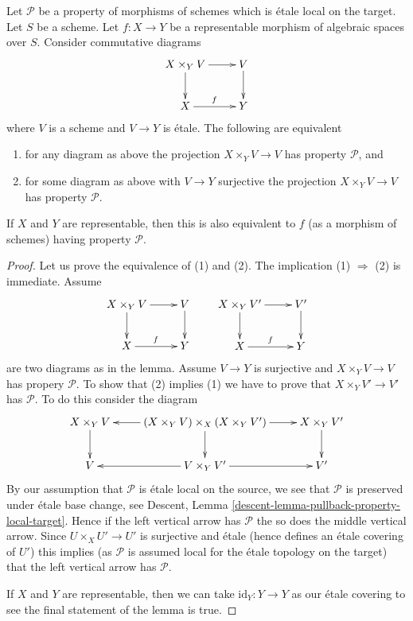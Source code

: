\begin{lemma}
\label{lemma-representable-etale-local-target}
Let $\mathcal{P}$ be a property of morphisms of schemes which is \'etale
local on the target. Let $S$ be a scheme.
Let $f : X \to Y$ be a representable morphism of algebraic spaces over $S$.
Consider commutative diagrams
$$
\xymatrix{
X \times_Y V \ar[d] \ar[r] & V \ar[d] \\
X \ar[r]^f & Y
}
$$
where $V$ is a scheme and $V \to Y$ is \'etale.
The following are equivalent
\begin{enumerate}
\item for any diagram as above the projection $X \times_Y V \to V$
has property $\mathcal{P}$, and
\item for some diagram as above with $V \to Y$ surjective
the projection $X \times_Y V \to V$ has property $\mathcal{P}$.
\end{enumerate}
If $X$ and $Y$ are representable, then this is also equivalent to
$f$ (as a morphism of schemes) having property $\mathcal{P}$.
\end{lemma}

\begin{proof}
Let us prove the equivalence of (1) and (2).
The implication (1) $\Rightarrow$ (2) is immediate.
Assume
$$
\xymatrix{
X \times_Y V \ar[d] \ar[r] & V \ar[d] \\
X \ar[r]^f & Y
}
\quad\quad
\xymatrix{
X \times_Y V' \ar[d] \ar[r] & V' \ar[d] \\
X \ar[r]^f & Y
}
$$
are two diagrams as in the lemma. Assume $V \to Y$ is
surjective and $X \times_Y V \to V$ has propery $\mathcal{P}$.
To show that (2) implies (1) we have to prove that
$X \times_Y V' \to V'$ has $\mathcal{P}$. To do
this consider the diagram
$$
\xymatrix{
X \times_Y V \ar[d] &
(X \times_Y V) \times_X (X \times_Y V') \ar[l] \ar[d] \ar[r] &
X \times_Y V' \ar[d] \\
V &
V \times_Y V' \ar[l] \ar[r] &
V'
}
$$
By our assumption that $\mathcal{P}$ is \'etale local on the source,
we see that $\mathcal{P}$ is preserved under \'etale base change, see
Descent, Lemma \ref{descent-lemma-pullback-property-local-target}.
Hence if the left vertical arrow has $\mathcal{P}$ the so does
the middle vertical arrow. Since $U \times_X U' \to U'$ is surjective
and \'etale (hence defines an \'etale covering of $U'$) 
this implies (as $\mathcal{P}$ is assumed local for the \'etale topology
on the target) that the left vertical arrow has $\mathcal{P}$.

\medskip\noindent
If $X$ and $Y$ are representable, then we can take
$\text{id}_Y : Y \to Y$ as our \'etale covering to see the
final statement of the lemma is true.
\end{proof}

